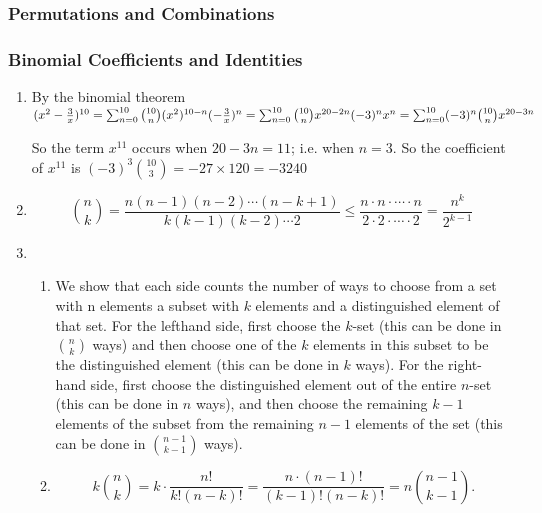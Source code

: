 \documentclass{sig-alternate-05-2015}
\begin{document}
\subsubsection{Permutations and Combinations}
\subsubsection{Binomial Coefficients and Identities}
\begin{enumerate}
	\item By the binomial theorem 	$(x^2-\frac{3}{x})^{10}\\=\sum_{n=0}^{10}\binom{10}{n}(x^2)^{10-n}(-\frac{3}{x})^n
	\\=\sum_{n=0}^{10}\binom{10}{n}x^{20-2n}(-3)^nx^n=\sum_{n=0}^{10}(-3)^n\binom{10}{n} x^{20-3n}$
	
	So the term $x^{11}$ occurs when $20-3n=11$; i.e. when $n=3$. So the coefficient of $x^{11}$ is $(-3)^3\binom{10}{3}=-27\times 120 = -3240$
	\item \begin{equation}
	\binom{n}{k} = \frac{n(n - 1)(n - 2) \cdots (n - k + 1)}{k(k - 1)(k - 2) \cdots 2} \le \frac{n \cdot n \cdot \cdots \cdot n}{2 \cdot 2 \cdot \cdots \cdot 2} = \frac{n^k}{2^{k - 1}}
	\end{equation}
	
	\item \begin{enumerate}
		\item We show that each side counts the number of ways
		to choose from a set with n elements a subset with $k$ elements
		and a distinguished element of that set. For the lefthand
		side, first choose the $k$-set (this can be done in $\binom{n}{k}$ ways)
		and then choose one of the $k$ elements in this subset to be
		the distinguished element (this can be done in $k$ ways). For
		the right-hand side, first choose the distinguished element out
		of the entire $n$-set (this can be done in $n$ ways), and then
		choose the remaining $k - 1$ elements of the subset from the
		remaining $n - 1$ elements of the set (this can be done in $\binom{n - 1}{k - 1}$ ways).
		\item \begin{equation}
			k \binom{n}{k} = k \cdot \frac{n!}{k!(n - k)!} = \frac{n \cdot (n - 1)!}{(k - 1)!(n - k)!} = n \binom{n - 1}{k - 1}.
		\end{equation}
	\end{enumerate}
	
\end{enumerate}
\end{document}
